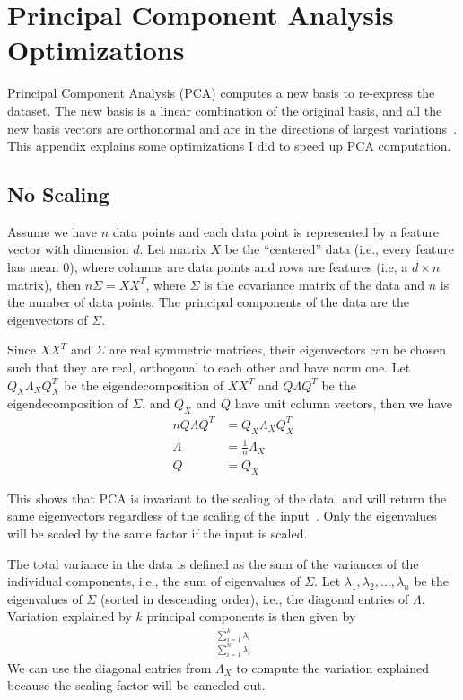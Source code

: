\chapter{Principal Component Analysis Optimizations}\label{app:pca}
Principal Component Analysis (PCA) computes a new basis to re-express the
dataset.
The new basis is a linear combination of the original basis, and all the new basis vectors are orthonormal
and are in the directions of largest variations~\cite{shlens2005}. This appendix
explains some optimizations I did to speed up PCA computation.

\section{No Scaling}

Assume we have $n$ data points and each data point is represented by a feature
vector with dimension $d$. Let matrix $X$ be the ``centered'' data (i.e., every
feature has mean 0), where columns are data points and rows are features (i.e,
a $d\times n$ matrix), then $n\Sigma = XX^T$, where $\Sigma$ is the covariance
matrix of the data and $n$ is the number of data points. The principal components of the data are the eigenvectors of
$\Sigma$.

Since $XX^T$ and $\Sigma$ are real symmetric matrices, their eigenvectors can be
chosen such that they are real, orthogonal to each other and have norm one. Let
$Q_X\Lambda_X Q_X^T$ be the  eigendecomposition of $XX^T$ and $Q\Lambda Q^T$ be
the eigendecomposition of $\Sigma$, and $Q_X$ and $Q$ have unit column
vectors, then we have
\begin{align*}
nQ\Lambda Q^T &= Q_X\Lambda_X Q_X^T  \\
\Lambda &= \frac{1}{n}\Lambda_X \\
Q &= Q_X
\end{align*}

This shows that PCA is invariant to the scaling of the data, and will return the
same eigenvectors regardless of the scaling of the input~\cite{pca14}. Only the
eigenvalues will be scaled by the same factor if the input is scaled. 

The total variance in the data is defined as the sum of the variances
of the individual components, i.e., the sum of eigenvalues of $\Sigma$. Let
$\lambda_1, \lambda_2, \ldots, \lambda_n$ be the eigenvalues of $\Sigma$
(sorted in descending order), i.e., the diagonal entries of $\Lambda$. Variation
explained by $k$ principal components is then given by
\begin{align}
\frac{\sum_{i=1}^{k} \lambda_i}{\sum_{i=1}^{n}\lambda_i}
\end{align}
We can use the diagonal entries from $\Lambda_X$ to compute the variation
explained because the scaling factor will be canceled out.

